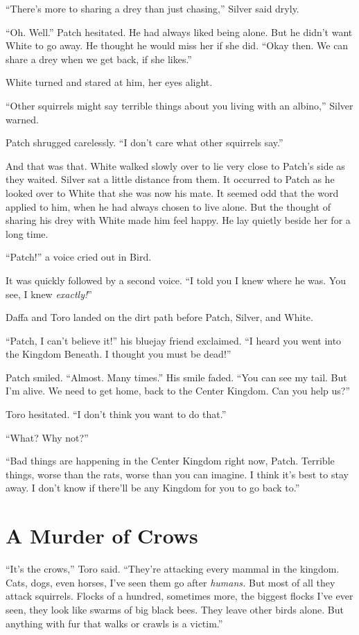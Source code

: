 \documentclass[ebook,oneside,openany,17pt]{memoir}
\newenvironment{tolerant}[1]{%
  \par\tolerance=#1\relax
}{%
  \par
}
\renewcommand{\thechapter}{\Roman{chapter}}
\newcounter{sections}
\newcommand{\sections}[1]{%
  \section*{#1}
  \addtocounter{sections}{1}%
  \pdfbookmark[1]{#1}{section.\thechapter.\thesections}}
\begin{document}
“There’s more to sharing a drey than just chasing,” Silver said dryly.

“Oh. Well.” Patch hesitated. He had always liked being alone. But he
didn’t want White to go away. He thought he would miss her if she
did. “Okay then. We can share a drey when we get back, if she likes.”

White turned and stared at him, her eyes alight.

“Other squirrels might say terrible things about you living with an
albino,” Silver warned.

\begin{tolerant}{2000}
Patch shrugged carelessly. “I don’t care what other squirrels say.”
\end{tolerant}

And that was that. White walked slowly over to lie very close to
Patch’s side as they waited. Silver sat a little distance from
them. It occurred to Patch as he looked over to White that she was now
his mate. It seemed odd that the word applied to him, when he had
always chosen to live alone. But the thought of sharing his drey with
White made him feel happy. He lay quietly beside her for a long time.

“Patch!” a voice cried out in Bird.

It was quickly followed by a second voice. “I told you I knew where he
was. You see, I knew \emph{exactly!}”

Daffa and Toro landed on the dirt path before Patch, Silver, and
White.

“Patch, I can’t believe it!” his bluejay friend exclaimed. “I heard
you went into the Kingdom Beneath. I thought you must be dead!”

Patch smiled. “Almost. Many times.” His smile faded. “You can see my
tail. But I’m alive. We need to get home, back to the Center
Kingdom. Can you help us?”

Toro hesitated. “I don’t think you want to do that.”

“What? Why not?”

“Bad things are happening in the Center Kingdom right now,
Patch. Terrible things, worse than the rats, worse than you can
imagine. I think it’s best to stay away. I don’t know if there’ll be
any Kingdom for you to go back to.”


\sections{A Murder of Crows}

\begin{tolerant}{1000}
“It’s the crows,” Toro said. “They’re attacking every mammal in the
kingdom. Cats, dogs, even horses, I’ve seen them go after
\emph{humans.} But most of all they attack squirrels. Flocks of a
hundred, sometimes more, the biggest flocks I’ve ever seen, they look
like swarms of big black bees. They leave other birds alone. But
anything with fur that walks or crawls is a victim.”
\end{tolerant}
\end{document}
